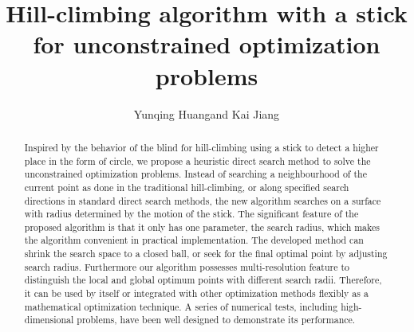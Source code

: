 \documentclass[mathpazo]{aamm}
\begin{document}

\title[Hill-Climbing Algorithm with a Stick] {
Hill-climbing algorithm with a stick for unconstrained optimization problems}

\author[Y. Huang and K. Jiang]{Yunqing Huang\corrauth and Kai Jiang}
\address{
Hunan Key Laboratory for Computation and Simulation in Science and Engineering, 
\\
Key Laboratory of Intelligent Computing \& Information Processing of Ministry of Education, 
\\ School of Mathematics and Computational Science,
Xiangtan University, Xiangtan {\rm 411105}, China }



\begin{abstract}
Inspired by the behavior of the blind for hill-climbing using a
stick to detect a higher place in the form of circle, 
we propose a heuristic direct search method to
solve the unconstrained optimization problems. 
Instead of searching a neighbourhood of the current point as done
in the traditional hill-climbing, or along specified search
directions in standard direct search methods, the new algorithm
searches on a surface with radius determined by the motion of the stick.
The significant feature of the proposed algorithm is that it only has one
parameter, the search radius, which makes the
algorithm convenient in practical implementation.
The developed method can shrink the search space to a closed ball, or
seek for the final optimal point by adjusting search radius. 
Furthermore our algorithm possesses multi-resolution
feature to distinguish the local and global optimum points  
with different search radii.
Therefore, it can be used by itself or integrated with other
optimization methods flexibly as a mathematical optimization technique.
A series of numerical tests, including high-dimensional problems,
have been well designed to demonstrate its performance.
\end{abstract}


\end{document}
